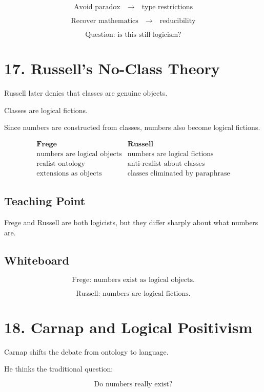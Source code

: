 \documentclass[11pt]{article}
\begin{document}
\[
\text{Avoid paradox}
\quad \rightarrow \quad
\text{type restrictions}
\]

\[
\text{Recover mathematics}
\quad \rightarrow \quad
\text{reducibility}
\]

\[
\text{Question: is this still logicism?}
\]

\section*{17. Russell's No-Class Theory}

Russell later denies that classes are genuine objects.

Classes are logical fictions.

Since numbers are constructed from classes, numbers also become logical fictions.

\[
\begin{array}{c|c}
\textbf{Frege} & \textbf{Russell} \\
\hline
\text{numbers are logical objects} & \text{numbers are logical fictions} \\
\text{realist ontology} & \text{anti-realist about classes} \\
\text{extensions as objects} & \text{classes eliminated by paraphrase}
\end{array}
\]

\subsection*{Teaching Point}

Frege and Russell are both logicists, but they differ sharply about what numbers are.

\subsection*{Whiteboard}

\[
\text{Frege: numbers exist as logical objects.}
\]

\[
\text{Russell: numbers are logical fictions.}
\]

\section*{18. Carnap and Logical Positivism}

Carnap shifts the debate from ontology to language.

He thinks the traditional question:

\[
\text{Do numbers really exist?}
\]
\end{document}
